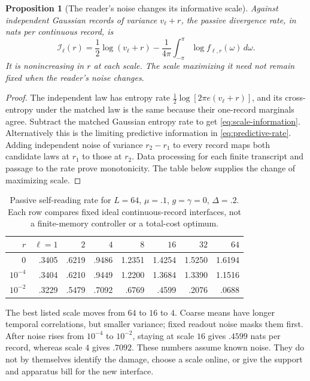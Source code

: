 \documentclass[12pt,a4paper]{article}
\newtheorem{proposition}[theorem]{Proposition}
\begin{document}
\begin{proposition}[The reader's noise changes its informative scale]
\label{prop:self-scale}
Against independent Gaussian records of variance $v_\ell+r$, the
passive divergence rate, in nats per continuous record, is
\begin{equation}\label{eq:scale-information}
 \mathcal I_\ell(r)=\frac12\log(v_\ell+r)
 -\frac1{4\pi}\int_{-\pi}^{\pi}\log f_{\ell,r}(\omega)\,d\omega.
\end{equation}
It is nonincreasing in $r$ at each scale. The scale maximizing it need
not remain fixed when the reader's noise changes.
\end{proposition}
\begin{proof}
The independent law has entropy rate
$\frac12\log[2\pi e(v_\ell+r)]$, and its cross-entropy under the
matched law is the same because their one-record marginals agree.
Subtract the matched Gaussian entropy rate to get
\eqref{eq:scale-information}. Alternatively this is the limiting
predictive information in \eqref{eq:predictive-rate}.
Adding independent noise of variance $r_2-r_1$ to every record maps
both candidate laws at $r_1$ to those at $r_2$. Data processing for
each finite transcript and passage to the rate prove monotonicity.
The table below supplies the change of maximizing scale.
\end{proof}

\begin{table}[ht]
\centering\small
\begin{tabular}{rrrrrrrr}
\toprule
$r$ & $\ell=1$ & $2$ & $4$ & $8$ & $16$ & $32$ & $64$\\
\midrule
$0$ & .3405 & .6219 & .9486 & 1.2351 & 1.4254 & 1.5250 & 1.6194\\
$10^{-4}$ & .3404 & .6210 & .9449 & 1.2200 & 1.3684 & 1.3390 & 1.1516\\
$10^{-2}$ & .3229 & .5479 & .7092 & .6769 & .4599 & .2076 & .0688\\
\bottomrule
\end{tabular}
\caption{Passive self-reading rate for $L=64$, $\mu=.1$, $g=\gamma=0$,
$\Delta=.2$. Each row compares fixed ideal continuous-record
interfaces, not a finite-memory controller or a total-cost optimum.}
\label{tab:self-scale}
\end{table}

The best listed scale moves from $64$ to $16$ to $4$. Coarse means
have longer temporal correlations, but smaller variance; fixed
readout noise masks them first. After noise rises from $10^{-4}$ to
$10^{-2}$, staying at scale $16$ gives $.4599$ nats per record,
whereas scale $4$ gives $.7092$. These numbers assume known noise.
They do not by themselves identify the damage, choose a scale online,
or give the support and apparatus bill for the new interface.
\end{document}
